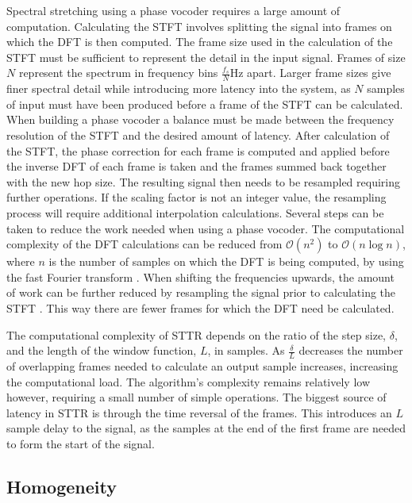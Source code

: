		Spectral stretching using a phase vocoder requires a large amount of computation. Calculating the STFT
		involves splitting the signal into frames on which the DFT is then computed. The frame size used in the
		calculation of the STFT must be sufficient to represent the detail in the input signal. Frames of size $N$
		represent the spectrum in frequency bins $\frac{f_{s}}{N}$Hz apart. Larger frame sizes give finer spectral
		detail while introducing more latency into the system, as $N$ samples of input must have been produced
		before a frame of the STFT can be calculated. When building a phase vocoder a balance must be made between
		the frequency resolution of the STFT and the desired amount of latency. After calculation of the STFT, the
		phase correction for each frame is computed and applied before the inverse DFT of each frame is taken and
		the frames summed back together with the new hop size. The resulting signal then needs to be resampled
		requiring further operations. If the scaling factor is not an integer value, the resampling process will
		require additional interpolation calculations. Several steps can be taken to reduce the work needed when
		using a phase vocoder. The computational complexity of the DFT calculations can be reduced from
		$\mathcal{O} \left( n^{2} \right)$ to $\mathcal{O}(n\log{n})$, where $n$ is the number of samples on which
		the DFT is being computed, by using the fast Fourier transform \citep{portnoff1976implementation}. When
		shifting the frequencies upwards, the amount of work can be further reduced by resampling the signal prior
		to calculating the STFT \citep{laroche1999new}. This way there are fewer frames for which the DFT need be
		calculated.

		The computational complexity of STTR depends on the ratio of the step size, $\delta$, and the length of the
		window function, $L$, in samples. As $\frac{\delta}{L}$ decreases the number of overlapping frames needed
		to calculate an output sample increases, increasing the computational load. The algorithm's complexity
		remains relatively low however, requiring a small number of simple operations. The biggest source of
		latency in STTR is through the time reversal of the frames. This introduces an $L$ sample delay to the
		signal, as the samples at the end of the first frame are needed to form the start of the signal.

	\subsection{Homogeneity}
	\label{sec:ExcitationEvaluation-Comparison-Homogeneity}
